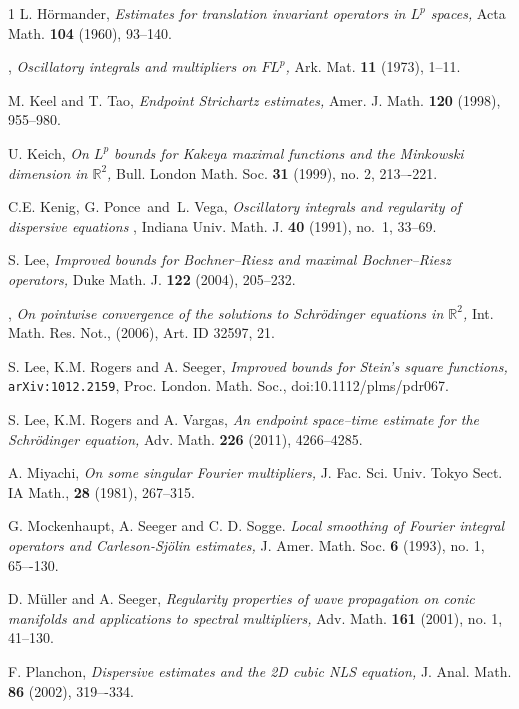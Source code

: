 \documentclass[11pt]{amsart}
\theoremstyle{definition}
\numberwithin{theorem}{section}
\numberwithin{definition}{section}
\numberwithin{equation}{section}
\newcommand{\R}{\mathbb{R}}
\def\R{\mathbb R}
\def\emph#1{{\it #1 }}
\def\bbR{{\mathbb {R}}}
\begin{document}
\begin{thebibliography}{1}
 L. H\"ormander, \emph{Estimates for translation invariant operators in $L^{p}$ spaces,}  Acta Math.  {\bf 104} (1960), 93--140.

 \bysame, \emph{Oscillatory integrals and multipliers on $FL^{p}$,}  Ark. Mat. {\bf 11} (1973), 1--11.


 M. Keel and T. Tao, \emph{Endpoint Strichartz estimates,} Amer. J. Math. {\bf 120} (1998), 955--980.

 U. Keich, \emph{
On $L^p$ bounds for Kakeya maximal functions and the Minkowski dimension in ${\bbR}^2$,}
Bull. London Math. Soc. {\bf 31} (1999), no. 2, 213–-221.


 C.E. Kenig, G. Ponce\ and\ L. Vega, \emph{Oscillatory integrals and regularity of dispersive equations}, Indiana Univ. Math. J. {\bf 40} (1991), no.~1, 33--69.

 S. Lee, \emph{Improved bounds
for Bochner--Riesz and maximal Bochner--Riesz operators,} Duke Math.
J.  {\bf 122}  (2004), 205--232.


 \bysame, \emph{On pointwise convergence of the solutions to Schr\"odinger    equations in $\R^2$,} Int. Math. Res. Not., (2006), Art. ID 32597, 21.


 S. Lee, K.M. Rogers and A. Seeger,
\emph{Improved bounds for Stein's square functions,} {\tt  arXiv:1012.2159}, {Proc. London. Math. Soc.}, doi:10.1112/plms/pdr067.




 S. Lee, K.M. Rogers and A. Vargas, \emph{An endpoint space--time estimate for the Schr\"odinger equation,} Adv. Math. {\bf 226} (2011), 4266--4285.



  A. Miyachi, \emph{On some singular Fourier multipliers,}
{J. Fac. Sci. Univ. Tokyo Sect. IA Math.,} {\bf 28} (1981),
{267--315}.




 G. Mockenhaupt, A. Seeger and C. D. Sogge.
\emph{Local smoothing of Fourier integral operators and Car\-leson-Sj\"o\-lin estimates,} J. Amer. Math. Soc. {\bf 6} (1993), no. 1, 65–-130.


 D. M\"uller and  A. Seeger, \emph{Regularity properties of wave propagation on conic manifolds and applications to spectral multipliers,}  Adv. Math.  {\bf 161}  (2001),  no. 1, 41–130.



F. Planchon, \emph{Dispersive estimates and the 2D cubic NLS equation,}
J. Anal. Math. {\bf 86} (2002), 319–-334.


\end{thebibliography}
\end{document}
